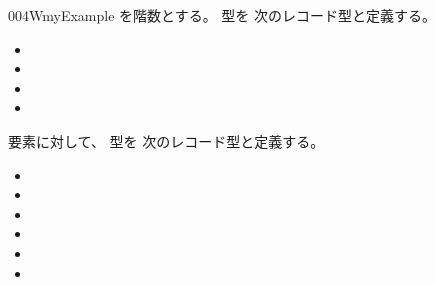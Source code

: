 \documentclass[index]{subfiles}
\begin{document}
\begin{myBlock}{004W}{myExample}
  を階数とする。
  型を
  次のレコード型と定義する。
  \begin{itemize}
  \item {}
  \item \myInlineMath{\myGroupUnit \myElemOf \myGroupCarrier}
  \item \myInlineMath{\myGroupMul \myElemOf
    \myGroupCarrier \myFunType \myGroupCarrier \myFunType \myGroupCarrier}
  \item \myInlineMath{\myGroupInv \myElemOf
    \myGroupCarrier \myFunType \myGroupCarrier}
  \end{itemize}
  要素に対して、
  型を
  次のレコード型と定義する。
  \begin{itemize}
  \item {}
  \item {}
  \item {}
  \item {}
  \item {}
  \item {}

\end{itemize}
\end{myBlock}
\end{document}
